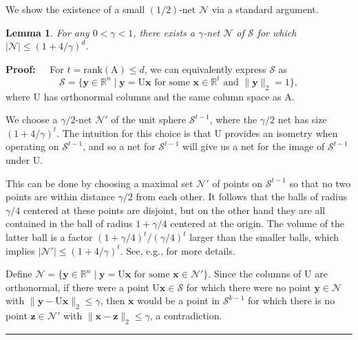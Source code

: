 \documentclass[11pt]{article}
\newtheorem{lemma}[theorem]{Lemma}
\newenvironment{proof}{\begin{trivlist} \item {\bf Proof:~~}}
  {\qed\end{trivlist}}
\newcommand{\mat}[1]{{\ensuremath{\bm{\mathrm{#1}}}}}
\def\matA{\mat{A}}
\def\matU{\mat{U}}
\def\qed{\hfill\rule{2mm}{2mm}}
\def\x{{\mathbf x}}
\def\y{{\mathbf y}}
\def\z{{\mathbf z}}
\begin{document}
We show the existence of a small $(1/2)$-net $\mathcal{N}$ via a standard argument.  
\begin{lemma}\label{lem:epsL2net}
For any $0 < \gamma < 1$, 
there exists a $\gamma$-net $\mathcal{N}$ of $\mathcal{S}$ for which $|\mathcal{N}| \leq (1 + 4/\gamma)^d$. 
\end{lemma}
\begin{proof}
For $t = \textrm{rank}(\matA) \leq d$, we can equivalently express $\mathcal{S}$ as 
$$\mathcal{S} = \{\y \in \mathbb{R}^n \mid \y = \matU \x \textrm{ for some } \x \in \mathbb{R}^t \textrm{ and } \|\y\|_2 = 1\},$$
where $\matU$ has orthonormal columns and the same column space as $\matA$. 

We choose a $\gamma/2$-net $\mathcal{N}'$ of the unit sphere $\mathcal{S}^{t-1}$, where the $\gamma/2$ net has
size $(1+4/\gamma)^t$. The intuition for this choice is that $\matU$ provides an isometry when operating on $\mathcal{S}^{t-1}$,
and so a net for $\mathcal{S}^{t-1}$ will give us a net for the image of $\mathcal{S}^{t-1}$ under $\matU$. 

This can
be done by choosing a maximal set $\mathcal{N}'$ of points on $\mathcal{S}^{t-1}$ so that no two points are within
distance $\gamma/2$ from each other. It follows that the balls of radius $\gamma/4$ centered at these points are
disjoint, but on the other hand they are all contained in the ball of radius $1+\gamma/4$ centered at the origin. 
The volume of the latter ball is a factor $(1+\gamma/4)^t/(\gamma/4)^t$ larger than the smaller balls, which
implies $|\mathcal{N}'| \leq (1+4/\gamma)^t$. See, e.g., \cite{m02} for more details.

Define 
$\mathcal{N} = \{\y \in \mathbb{R}^n \mid \y = \matU \x \textrm{ for some } \x \in \mathcal{N}'\}.$
Since the columns of $\matU$ are orthonormal, if there were a point $\matU \x \in \mathcal{S}$ for which there
were no point $\y \in \mathcal{N}$ with $\|\y-\matU \x\|_2 \leq \gamma$, 
then $\x$ would be a point in $\mathcal{S}^{k-1}$
for which there is no point $\z \in \mathcal{N}'$ with $\|\x-\z\|_2 \leq \gamma$, a contradiction. 
\end{proof}
\end{document}
